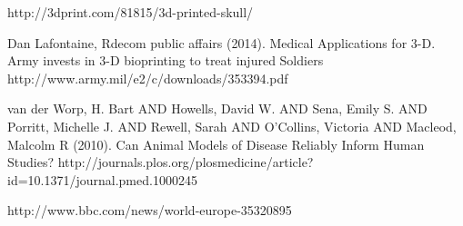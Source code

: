 \documentclass[12pt]{article} %
\begin{document}
\begin{thebibliography}{99}
\begin{small}
\newblock http://3dprint.com/81815/3d-printed-skull/

\newblock Dan Lafontaine, Rdecom public affairs (2014).
\newline Medical Applications for 3-D. Army invests in 3-D bioprinting to treat injured Soldiers
\newblock http://www.army.mil/e2/c/downloads/353394.pdf

\newblock van der Worp, H. Bart AND Howells, David W. AND Sena, Emily S. AND Porritt, Michelle J. AND Rewell, Sarah AND O'Collins, Victoria AND Macleod, Malcolm R
(2010). 
\newline Can Animal Models of Disease Reliably Inform Human Studies?
\newblock http://journals.plos.org/plosmedicine/article?id=10.1371/journal.pmed.1000245

\newblock http://www.bbc.com/news/world-europe-35320895


\end{small}
\end{thebibliography}

\end{document}

